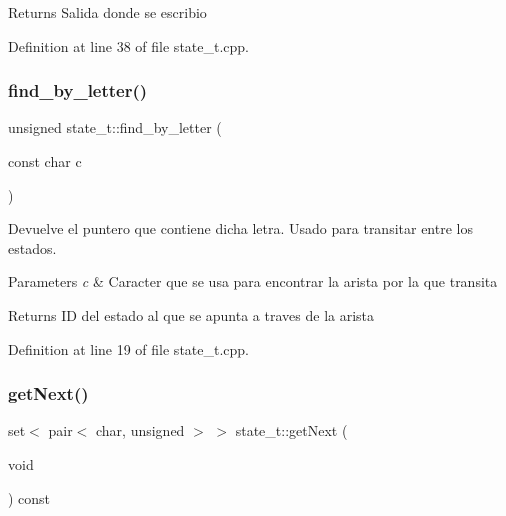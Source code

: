 \begin{DoxyReturn}{Returns}
Salida donde se escribio 
\end{DoxyReturn}


Definition at line 38 of file state\+\_\+t.\+cpp.

\mbox{\label{classstate__t_a716e1078c9486ebb9686dfc97d5749c7}} 
\subsubsection{\texorpdfstring{find\+\_\+by\+\_\+letter()}{find\_by\_letter()}}
{\footnotesize\ttfamily unsigned state\+\_\+t\+::find\+\_\+by\+\_\+letter (\begin{DoxyParamCaption}\item[{const char}]{c }\end{DoxyParamCaption})}



Devuelve el puntero que contiene dicha letra. Usado para transitar entre los estados. 


\begin{DoxyParams}{Parameters}
{\em c} & Caracter que se usa para encontrar la arista por la que transita \\
\hline
\end{DoxyParams}
\begin{DoxyReturn}{Returns}
ID del estado al que se apunta a traves de la arista 
\end{DoxyReturn}


Definition at line 19 of file state\+\_\+t.\+cpp.

\mbox{\label{classstate__t_a2ab5aaf45f890ade849fc87a0da80f6a}} 
\subsubsection{\texorpdfstring{get\+Next()}{getNext()}}
{\footnotesize\ttfamily set$<$ pair$<$ char, unsigned $>$ $>$ state\+\_\+t\+::get\+Next (\begin{DoxyParamCaption}\item[{void}]{ }\end{DoxyParamCaption}) const}



